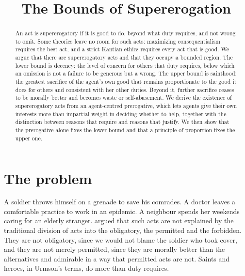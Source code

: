 \documentclass{situationist-preprint}
\title{The Bounds of Supererogation}
\begin{document}
\maketitle

\begin{abstract}
An act is supererogatory if it is good to do, beyond what duty requires, and not wrong to omit. Some theories leave no room for such acts: maximizing consequentialism requires the best act, and a strict Kantian ethics requires every act that is good. We argue that there are supererogatory acts and that they occupy a bounded region. The lower bound is decency: the level of concern for others that duty requires, below which an omission is not a failure to be generous but a wrong. The upper bound is sainthood: the greatest sacrifice of the agent's own good that remains proportionate to the good it does for others and consistent with her other duties. Beyond it, further sacrifice ceases to be morally better and becomes waste or self-abasement. We derive the existence of supererogatory acts from an agent-centred prerogative, which lets agents give their own interests more than impartial weight in deciding whether to help, together with the distinction between reasons that require and reasons that justify. We then show that the prerogative alone fixes the lower bound and that a principle of proportion fixes the upper one.
\end{abstract}

\section{The problem}

A soldier throws himself on a grenade to save his comrades. A doctor leaves a comfortable practice to work in an epidemic. A neighbour spends her weekends caring for an elderly stranger. \citet{Urmson1958} argued that such acts are not explained by the traditional division of acts into the obligatory, the permitted and the forbidden. They are not obligatory, since we would not blame the soldier who took cover, and they are not merely permitted, since they are morally better than the alternatives and admirable in a way that permitted acts are not. Saints and heroes, in Urmson's terms, do more than duty requires.
\end{document}
